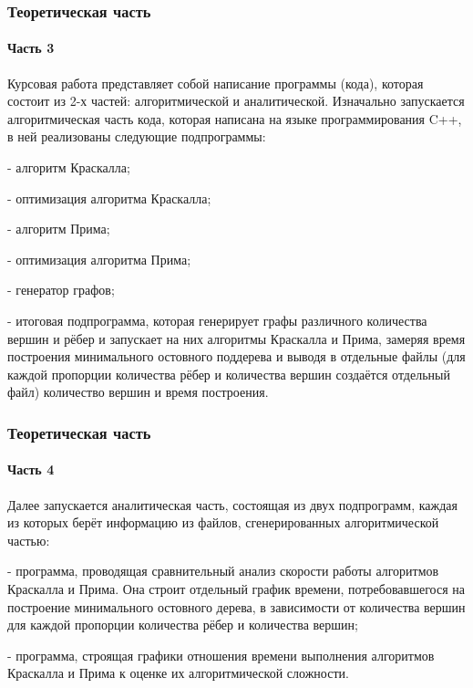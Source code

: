 \documentclass[aspectratio=169]{beamer}
\begin{document}
\begin{frame}
	\frametitle{Теоретическая часть}
	\framesubtitle{Часть 3}
	\hspace{0.5cm} Курсовая работа представляет собой написание программы (кода), которая состоит из 2-х частей: алгоритмической и аналитической. Изначально запускается алгоритмическая часть кода, которая написана на языке программирования C++, в ней реализованы следующие подпрограммы:
	
	\hspace{0.5cm}- алгоритм Краскалла;
	
	\hspace{0.5cm}- оптимизация алгоритма Краскалла;
	
	\hspace{0.5cm}- алгоритм Прима;
	
	\hspace{0.5cm}- оптимизация алгоритма Прима;
	
	\hspace{0.5cm}- генератор графов;
	
	\hspace{0.5cm}- итоговая подпрограмма, которая генерирует графы различного количества вершин и рёбер и запускает на них алгоритмы Краскалла и Прима, замеряя время построения минимального остовного поддерева и выводя в отдельные файлы (для каждой пропорции количества рёбер и количества вершин создаётся отдельный файл) количество вершин и время построения.
\end{frame}

\begin{frame}
	\frametitle{Теоретическая часть}
	\framesubtitle{Часть 4}
	\hspace{0.5cm}Далее запускается аналитическая часть, состоящая из двух подпрограмм, каждая из которых берёт информацию из файлов, сгенерированных алгоритмической частью:
	
	\hspace{0.5cm}- программа, проводящая сравнительный анализ скорости работы алгоритмов Краскалла и Прима. Она строит отдельный график времени, потребовавшегося на построение минимального остовного дерева, в зависимости от количества вершин для каждой пропорции количества рёбер и количества вершин;
	
	\hspace{0.5cm}- программа, строящая графики отношения времени выполнения алгоритмов Краскалла и Прима к оценке их алгоритмической сложности.
\end{frame}
\end{document}
